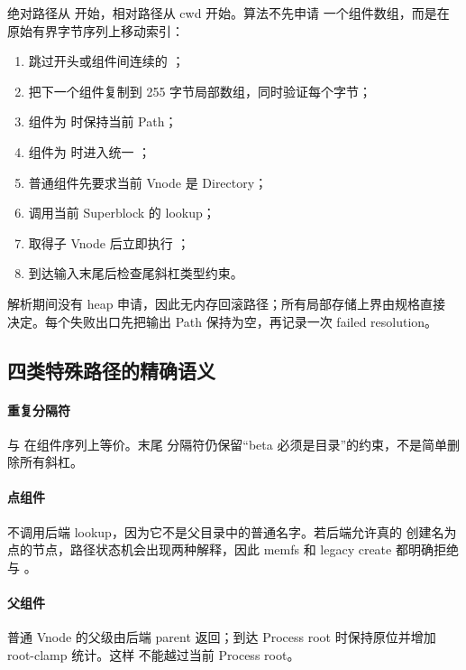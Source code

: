 绝对路径从  开始，相对路径从 cwd 开始。算法不先申请
一个组件数组，而是在原始有界字节序列上移动索引：

\begin{enumerate}
  \item 跳过开头或组件间连续的 \code{/}；
  \item 把下一个组件复制到 255 字节局部数组，同时验证每个字节；
  \item 组件为  时保持当前 Path；
  \item 组件为  时进入统一 ；
  \item 普通组件先要求当前 Vnode 是 Directory；
  \item 调用当前 Superblock 的 lookup；
  \item 取得子 Vnode 后立即执行 ；
  \item 到达输入末尾后检查尾斜杠类型约束。
\end{enumerate}

解析期间没有 heap 申请，因此无内存回滚路径；所有局部存储上界由规格直接
决定。每个失败出口先把输出 Path 保持为空，再记录一次 failed resolution。

\subsection{四类特殊路径的精确语义}

\paragraph{重复分隔符}

 与  在组件序列上等价。末尾
分隔符仍保留“beta 必须是目录”的约束，不是简单删除所有斜杠。

\paragraph{点组件}

 不调用后端 lookup，因为它不是父目录中的普通名字。若后端允许真的
创建名为点的节点，路径状态机会出现两种解释，因此 memfs 和 legacy create
都明确拒绝  与 。

\paragraph{父组件}

普通 Vnode 的父级由后端 parent 返回；到达 Process root 时保持原位并增加
root-clamp 统计。这样  不能越过当前 Process root。

